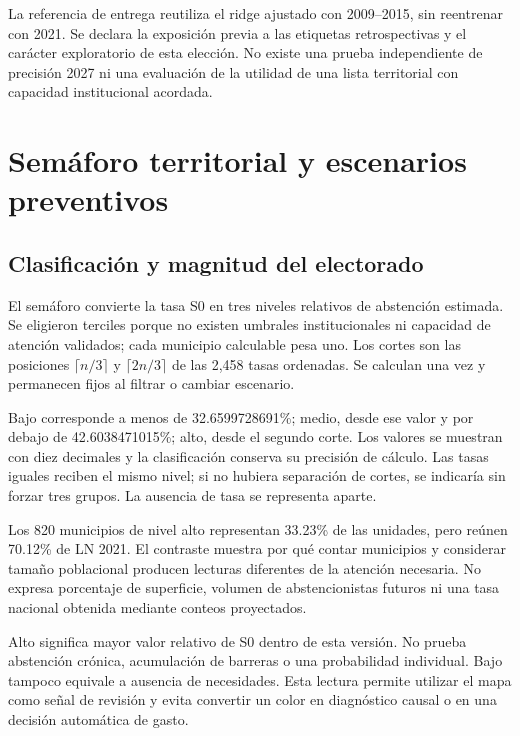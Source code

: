 \documentclass[12pt,a4paper]{article}
\newcommand{\primerparrafo}{\par\noindent\hspace*{1.1em}}
\newcommand{\iniciartabla}{\rowcolors{2}{NCSurfaceMuted}{white}}
\newcommand{\terminartabla}{\rowcolors{1}{}{}}
\newcommand{\pagina}[1]{\clearpage\section{#1}}
\begin{document}
La referencia de entrega reutiliza el ridge ajustado con 2009--2015, sin reentrenar con 2021. Se declara la exposición previa a las etiquetas retrospectivas y el carácter exploratorio de esta elección. No existe una prueba independiente de precisión 2027 ni una evaluación de la utilidad de una lista territorial con capacidad institucional acordada.

\pagina{Semáforo territorial y escenarios preventivos}
\subsection{Clasificación y magnitud del electorado}
\primerparrafo
El semáforo convierte la tasa S0 en tres niveles relativos de abstención estimada. Se eligieron terciles porque no existen umbrales institucionales ni capacidad de atención validados; cada municipio calculable pesa uno. Los cortes son las posiciones $\lceil n/3\rceil$ y $\lceil2n/3\rceil$ de las 2,458 tasas ordenadas. Se calculan una vez y permanecen fijos al filtrar o cambiar escenario.

Bajo corresponde a menos de 32.6599728691\%; medio, desde ese valor y por debajo de 42.6038471015\%; alto, desde el segundo corte. Los valores se muestran con diez decimales y la clasificación conserva su precisión de cálculo. Las tasas iguales reciben el mismo nivel; si no hubiera separación de cortes, se indicaría sin forzar tres grupos. La ausencia de tasa se representa aparte.

\begin{table}[ht]
\centering
\iniciartabla
\caption{Distribución municipal y peso de la LN por nivel S0.}
\label{tab:semaforo}
\small
\setlength{\tabcolsep}{4pt}

\terminartabla
\end{table}

Los 820 municipios de nivel alto representan 33.23\% de las unidades, pero reúnen 70.12\% de LN 2021. El contraste muestra por qué contar municipios y considerar tamaño poblacional producen lecturas diferentes de la atención necesaria. No expresa porcentaje de superficie, volumen de abstencionistas futuros ni una tasa nacional obtenida mediante conteos proyectados.

Alto significa mayor valor relativo de S0 dentro de esta versión. No prueba abstención crónica, acumulación de barreras o una probabilidad individual. Bajo tampoco equivale a ausencia de necesidades. Esta lectura permite utilizar el mapa como señal de revisión y evita convertir un color en diagnóstico causal o en una decisión automática de gasto.
\end{document}
